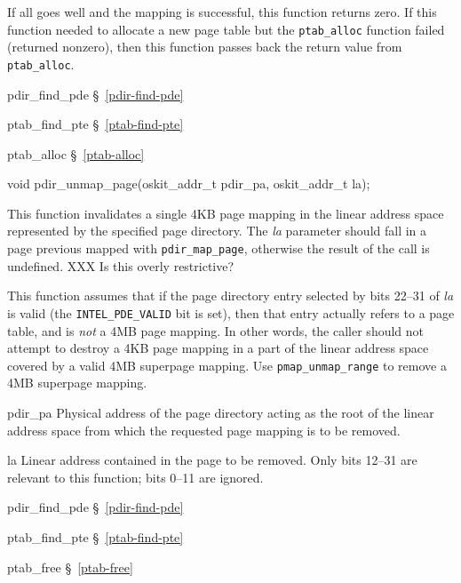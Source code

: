 \begin{apiret}
	If all goes well and the mapping is successful,
	this function returns zero.
	If this function needed to allocate a new page table
	but the {\tt ptab_alloc} function failed (returned nonzero),
	then this function passes back the return value from {\tt ptab_alloc}.
\end{apiret}
\begin{apidep}
	\item[pdir_find_pde]	\S~\ref{pdir-find-pde}
	\item[ptab_find_pte]	\S~\ref{ptab-find-pte}
	\item[ptab_alloc]	\S~\ref{ptab-alloc}
\end{apidep}

\label{pdir-unmap-page}
\begin{apisyn}

	\funcproto void pdir_unmap_page(oskit_addr_t pdir_pa, oskit_addr_t la);
\end{apisyn}
\begin{apidesc}
	This function invalidates a single 4KB page mapping
	in the linear address space represented by the specified page directory.
	The \emph{la} parameter should fall in a page previous mapped with
	{\tt pdir_map_page}, otherwise the result of the call is undefined.
	XXX Is this overly restrictive?

	This function assumes that
	if the page directory entry selected by bits 22--31 of \emph{la}
	is valid (the {\tt INTEL_PDE_VALID} bit is set),
	then that entry actually refers to a page table,
	and is \emph{not} a 4MB page mapping.
	In other words,
	the caller should not attempt to destroy a 4KB page mapping
	in a part of the linear address space
	covered by a valid 4MB superpage mapping.
	Use {\tt pmap_unmap_range} to remove a 4MB superpage mapping.
\end{apidesc}
\begin{apiparm}
	\item[pdir_pa]
		Physical address of the page directory
		acting as the root of the linear address space
		from which the requested page mapping is to be removed.
	\item[la]
		Linear address contained in the page to be removed.
		Only bits 12--31 are relevant to this function;
		bits 0--11 are ignored.
\end{apiparm}
\begin{apidep}
	\item[pdir_find_pde]	\S~\ref{pdir-find-pde}
	\item[ptab_find_pte]	\S~\ref{ptab-find-pte}
	\item[ptab_free]	\S~\ref{ptab-free}
\end{apidep}

